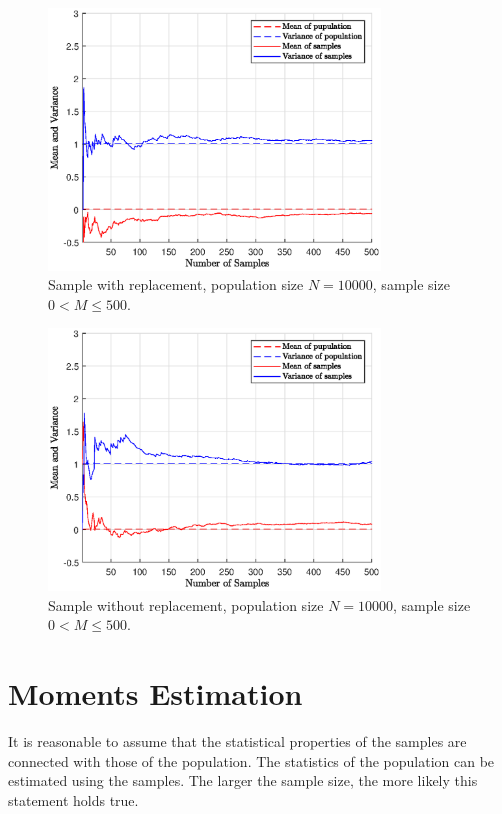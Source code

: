 \begin{figure}[!htb]
	\centering
	\includegraphics[width=250pt]{chapters/part-2/figures/sample-wr-n10000.eps}
	\caption{Sample with replacement, population size $N=10000$, sample size $0< M\leq500$.} \label{ch:sampling:fig:sample-wr-n10000}
\end{figure}

\begin{figure}[!htb]
	\centering
	\includegraphics[width=250pt]{chapters/part-2/figures/sample-nwr-n10000.eps}
	\caption{Sample without replacement, population size $N=10000$, sample size $0< M\leq500$.} \label{ch:sampling:fig:sample-nwr-n10000}
\end{figure}

\section{Moments Estimation}

It is reasonable to assume that the statistical properties of the samples are connected with those of the population. The statistics of the population can be estimated using the samples. The larger the sample size, the more likely this statement holds true.

